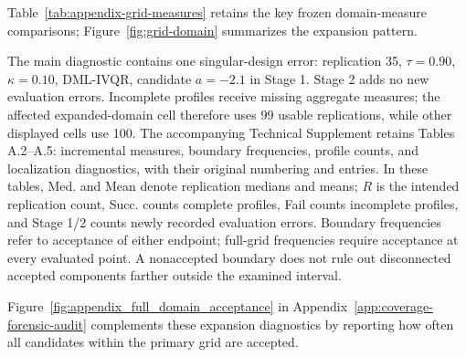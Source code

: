 Table~\ref{tab:appendix-grid-measures} retains the key frozen domain-measure comparisons; Figure~\ref{fig:grid-domain} summarizes the expansion pattern.


The main diagnostic contains one singular-design error: replication 35, $\tau=0.90$, $\kappa=0.10$, DML-IVQR, candidate $a=-2.1$ in Stage 1. Stage 2 adds no new evaluation errors. Incomplete profiles receive missing aggregate measures; the affected expanded-domain cell therefore uses 99 usable replications, while other displayed cells use 100. The accompanying Technical Supplement retains Tables A.2--A.5: incremental measures, boundary frequencies, profile counts, and localization diagnostics, with their original numbering and entries. In these tables, Med. and Mean denote replication medians and means; $R$ is the intended replication count, Succ. counts complete profiles, Fail counts incomplete profiles, and Stage 1/2 counts newly recorded evaluation errors. Boundary frequencies refer to acceptance of either endpoint; full-grid frequencies require acceptance at every evaluated point. A nonaccepted boundary does not rule out disconnected accepted components farther outside the examined interval.


\FloatBarrier

Figure~\ref{fig:appendix_full_domain_acceptance} in Appendix~\ref{app:coverage-forensic-audit} complements these expansion diagnostics by reporting how often all candidates within the primary grid are accepted.
\Needspace{7\baselinedist}
